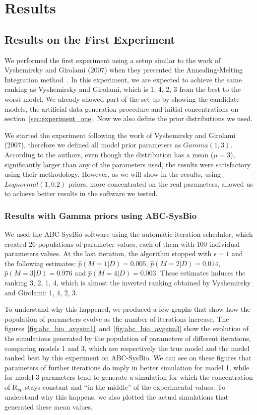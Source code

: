 \section{Results}

\subsection{Results on the First Experiment}
We performed the first experiment using a setup similar to the work of
Vyshemirsky and Girolami (2007) when they presented the 
Annealing-Melting Integration method~\cite{Vyshemirsky2007}. 
In this experiment, we are expected to achieve the same ranking as 
Vyshemirsky and Girolami, which is 1, 4, 2, 3 from the best to the worst 
model. We already showed part of the set up by showing the candidate 
models, the artificial data generation procedure and initial 
concentrations on section~\ref{sec:experiment_one}. Now we also define 
the prior distributions we used. 

We started the experiment following the work of Vyshemirsky and Girolami
(2007), therefore we defined all model prior parameters as 
$Gamma (1, 3)$. According to the authors, even though the distribution 
has a mean ($\mu = 3$), significantly larger than any of the parameters
used, the results were satisfactory using their methodology. However,
as we will show in the results, using $Lognormal (1, 0.2)$ priors, more 
concentrated on the real parameters, allowed us to achieve better 
results in the software we tested. 


\subsubsection{Results with Gamma priors using ABC-SysBio}
We used the ABC-SysBio software using the automatic iteration scheduler,
which created 26 populations of parameter values, each of them with 100
individual parameters values. At the last iteration, the algorithm 
stopped with $\epsilon = 1$ and the following estimates: 
$\hat{p} (M = 1 | D) = 0.005$, $\hat{p} (M = 2 | D) = 0.014$, 
$\hat{p} (M = 3 | D) = 0.976$ and $\hat{p} (M = 4 | D) = 0.003$. These
estimates induces the ranking 3, 2, 1, 4, which is almost the inverted
ranking obtained by Vyshemirsky and Girolami: 1, 4, 2, 3. 

To understand why this happened, we produced a few graphs that show how
the population of parameters evolve as the number of iterations 
increase. The 
figures~\ref{fig:abc_bio_avgsim1}~and~\ref{fig:abc_bio_avgsim3} show the 
evolution of the simulations generated by the population of parameters 
of different iterations, comparing models 1 and 3, which are 
respectively the true model and the model ranked best by this experiment 
on ABC-SysBio. We can see on these figures that parameters of further 
iterations do imply in better simulation for model 1, while for model 3 
parameters tend to generate a simulation for which the concentration of
R$_{pp}$ stays constant and ``in the middle'' of the experimental 
values. To understand why this happens, we also plotted the actual 
simulations that generated these mean values.

